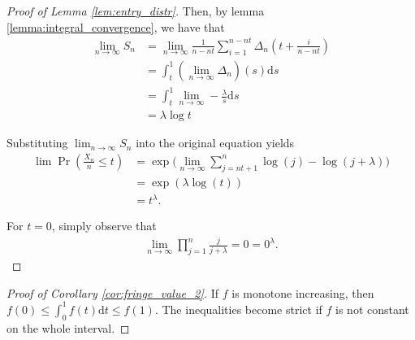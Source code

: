 \documentclass[a4paper]{article}
\newcommand{\dt}{\mathrm{d}t}
\newcommand{\ds}{\mathrm{d}s}
\begin{document}
\begin{proof}[Proof of Lemma \ref{lem:entry_distr}]
    Then, by lemma \ref{lemma:integral_convergence}, we have that
    \begin{align*}
        \lim_{n \to \infty} S_n &= \lim_{n \to \infty} \frac{1}{n-nt} \sum_{i=1}^{n-nt} \Delta_n \left( t + \frac{i}{n - nt} \right) \\
        &= \int_t^1 (\lim_{n \to \infty} \Delta_n)(s) \ds \\
        &= \int_t^1 \lim_{n \to \infty} -\frac{\lambda}{s} \ds \\
        &= \lambda \log{t}
    \end{align*}

    Substituting $\lim_{n \to \infty} S_n$ into the original equation yields
    \begin{align*}
        \lim \Pr \left( \frac{X_n}{n} \leq t \right) &= \exp \Bigg( \lim_{n \to \infty} \sum_{j = nt + 1}^n \log(j) - \log(j+\lambda) \Bigg) \\
        &= \exp(\lambda \log(t)) \\
        &= t^\lambda.
    \end{align*}

    For $t=0$, simply observe that %
    \begin{align*}
        \lim_{n \to \infty} \prod_{j = 1}^n \frac{j}{j + \lambda} = 0 = 0^\lambda.
    \end{align*}
\end{proof}

\begin{proof}[Proof of Corollary \ref{cor:fringe_value_2}]
    If $f$ is monotone increasing, then $f(0) \leq \int_0^1 f(t) \dt \leq f(1)$. The inequalities become strict if $f$ is not constant on the whole interval.
\end{proof}
\end{document}
